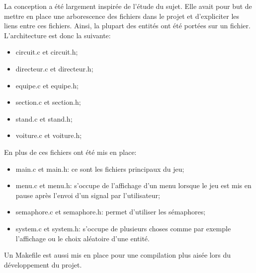 \documentclass[a4paper, 11pt]{article}
\begin{document}
		La conception a été largement inspirée de l'étude du sujet. Elle avait pour but de mettre en place une arborescence des fichiers dans le projet et d'expliciter les liens entre ces fichiers. Ainsi, la plupart des entités ont été portées sur un fichier. L'architecture est donc la suivante:
		\begin{itemize}
			\item circuit.c et circuit.h;
			\item directeur.c et directeur.h;
			\item equipe.c et equipe.h;
			\item section.c et section.h;
			\item stand.c et stand.h;
			\item voiture.c et voiture.h;
		\end{itemize}
		
		En plus de ces fichiers ont été mis en place:
		\begin{itemize}
			\item main.c et main.h: ce sont les fichiers principaux du jeu;
			\item menu.c et menu.h: s'occupe de l'affichage d'un menu lorsque le jeu est mis en pause après l'envoi d'un signal par l'utilisateur;
			\item semaphore.c et semaphore.h: permet d'utiliser les sémaphores;
			\item system.c et system.h: s'occupe de plusieurs choses comme par exemple l'affichage ou le choix aléatoire d'une entité.\\
		\end{itemize}
		
		Un Makefile est aussi mis en place pour une compilation plus aisée lors du développement du projet.
		
	\tableofcontents
		
\end{document}
